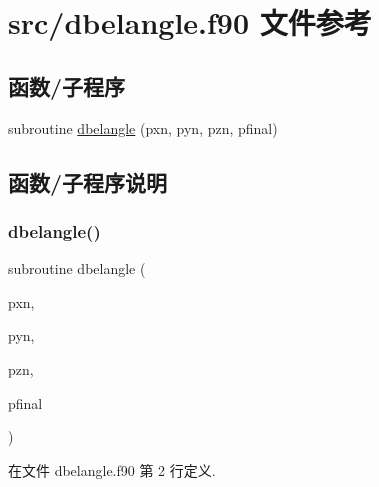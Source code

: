 \hypertarget{dbelangle_8f90}{}\section{src/dbelangle.f90 文件参考}
\label{dbelangle_8f90}
\subsection*{函数/子程序}
\begin{DoxyCompactItemize}
\item 
subroutine \mbox{\hyperlink{dbelangle_8f90_ae9331c4b7145316a022e94893f6d3cad}{dbelangle}} (pxn, pyn, pzn, pfinal)
\end{DoxyCompactItemize}


\subsection{函数/子程序说明}
\mbox{\label{dbelangle_8f90_ae9331c4b7145316a022e94893f6d3cad}} 
\subsubsection{\texorpdfstring{dbelangle()}{dbelangle()}}
{\footnotesize\ttfamily subroutine dbelangle (\begin{DoxyParamCaption}\item[{}]{pxn,  }\item[{}]{pyn,  }\item[{}]{pzn,  }\item[{}]{pfinal }\end{DoxyParamCaption})}



在文件 dbelangle.\+f90 第 2 行定义.

